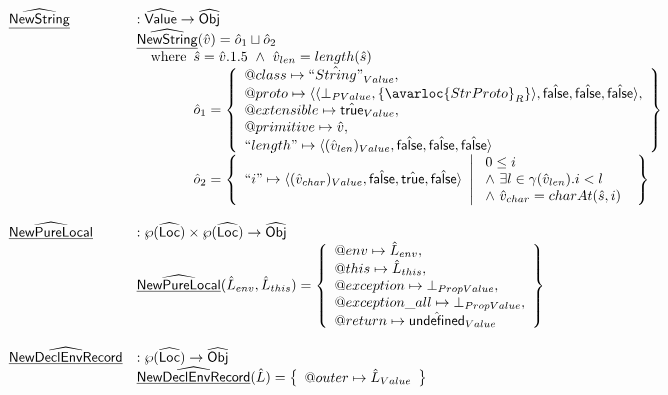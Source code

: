 \[\begin{array}{ll}
\ahf{NewString} & : \abs{Value} \rightarrow \aObj \\
& \ahf{NewString}(\hat{v}) = \hat{o}_1 \sqcup \hat{o}_2 \\
& \quad\wherec{
  \hat{s} = \hat{v}.1.5\ \land\ \hat{v}_{len} = length(\hat{s})\\
  \hat{o}_1 = \set{
    \varprop{class}\mapsto \hat{``String"}_{Value},\\
    \varprop{proto}\mapsto 
    \langle\langle\bot_{PValue},\{\avarloc{StrProto}_R\}\rangle,\afalse,\afalse,\afalse\rangle,\\
    \varprop{extensible}\mapsto \atrue_{Value}, \\
    \varprop{primitive}\mapsto \hat{v}, \\
    ``length"\mapsto \langle (\hat{v}_{len})_{Value}, \afalse, \afalse, \afalse\rangle \\
  } \\
  \hat{o}_2 = \set{``i"\mapsto \langle (\hat{v}_{char})_{Value}, \afalse, \atrue, \afalse\rangle ~\left|~
      \begin{array}{l}
        0 \leq i\\
        \land\ \exists l\in\gamma(\hat{v}_{len}).i < l\\
        \land\ \hat{v}_{char} = charAt(\hat{s},i)
      \end{array}
    \right.}
}\\
\\

\ahf{NewPureLocal} & : \powerset{\abs{Loc}} \times \powerset{\abs{Loc}} \rightarrow \aObj \\
& \ahf{NewPureLocal}(\hat{L}_{env}, \hat{L}_{this}) = \set{
    \varprop{env} \mapsto \hat{L}_{env}, \\
    \varprop{this} \mapsto \hat{L}_{this}, \\
    \varprop{exception} \mapsto \bot_{PropValue}, \\
    \varprop{exception\_all} \mapsto \bot_{PropValue}, \\
    \varprop{return} \mapsto \aundef_{Value} 
}\\
\\

\ahf{NewDeclEnvRecord} & : \powerset{\aLoc} \rightarrow \aObj \\
& \ahf{NewDeclEnvRecord}(\hat{L}) = \set{
    \varprop{outer} \mapsto \hat{L}_{Value}
}\\
\\


\end{array}\]
